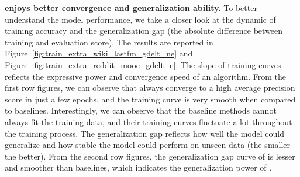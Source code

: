 \noindent\textbf{\our enjoys better convergence and generalization ability.}
To better understand the model performance, we take a closer look at the dynamic of training accuracy and the generalization gap (the absolute difference between training and evaluation score).
The results are reported in Figure~\ref{fig:train_extra_wiki_lastfm_gdelt_ne} and Figure~\ref{fig:train_extra_reddit_mooc_gdelt_e}:
 The slope of training curves reflects the expressive power and convergence speed of an algorithm. From the first row figures, we can observe that \our always converge to a high average precision score in just a few epochs, and the training curve is very smooth when compared to baselines. Interestingly, we can observe that the baseline methods cannot always fit the training data, and their training curves fluctuate a lot throughout the training process. 
 The generalization gap reflects how well the model could generalize and how stable the model could perform on unseen data (the smaller the better).
    From the second row figures, the generalization gap curve of \our is lesser and smoother than baselines, which indicates the generalization power of \oure.



